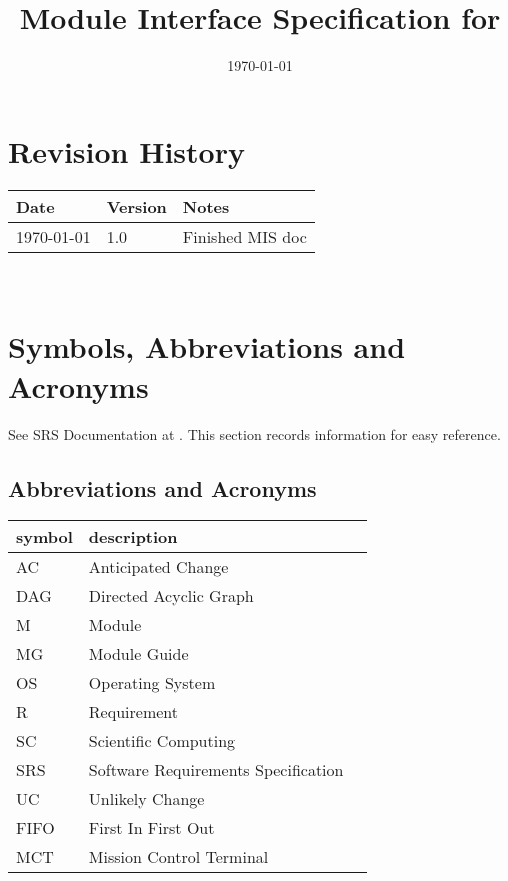 \documentclass[12pt, titlepage]{article}
\begin{document}
\title{Module Interface Specification for \progname{}}

\author{\authname}

\date{\today}

\maketitle


\section{Revision History}

\begin{tabularx}{\textwidth}{p{3cm}p{2cm}X}
\toprule {\bf Date} & {\bf Version} & {\bf Notes}\\
\midrule
\today & 1.0 & Finished MIS doc\\
\bottomrule
\end{tabularx}

~\newpage

\section{Symbols, Abbreviations and Acronyms}

See SRS Documentation at \wss. This section records information for easy reference.

\subsection{Abbreviations and Acronyms}

\renewcommand{\arraystretch}{1.2}
\begin{tabular}{l l} 
  \toprule		
  \textbf{symbol} & \textbf{description}\\
  \midrule 
  AC & Anticipated Change\\
  DAG & Directed Acyclic Graph \\
  M & Module \\
  MG & Module Guide \\
  OS & Operating System \\
  R & Requirement\\
  SC & Scientific Computing \\
  SRS & Software Requirements Specification\\
  UC & Unlikely Change \\
  FIFO & First In First Out \\
  MCT & Mission Control Terminal 
   & \\
  \bottomrule
\end{tabular}\\
\end{document}
